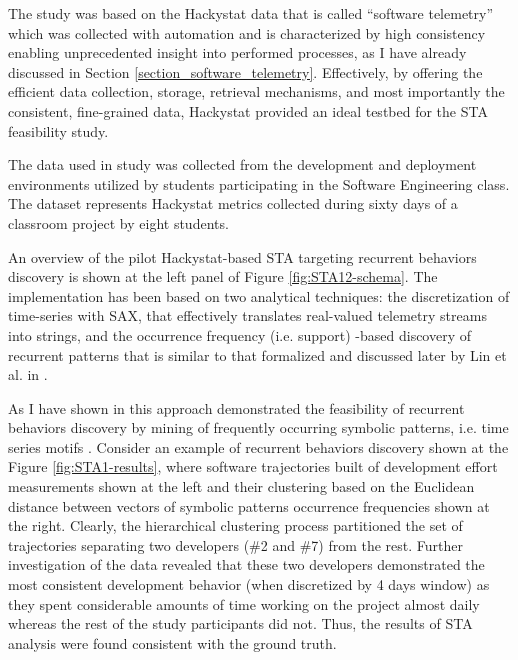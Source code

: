 The study was based on the Hackystat data that is called ``software telemetry'' \cite{citeulike:12929227} which was collected with automation and is characterized by high consistency enabling unprecedented insight into performed processes, as I have already discussed in Section \ref{section_software_telemetry}. Effectively, by offering the efficient data collection, storage, retrieval mechanisms, and most importantly the consistent, fine-grained data, Hackystat provided an ideal testbed for the STA feasibility study.

The data used in study was collected from the development and deployment environments utilized by students participating in the Software Engineering class. The dataset represents Hackystat metrics collected during sixty days of a classroom project by eight students. 

An overview of the pilot Hackystat-based STA targeting recurrent behaviors discovery is shown at the left panel of Figure  \ref{fig:STA12-schema}. The implementation has been based on two analytical techniques: the discretization of time-series with SAX, that effectively translates real-valued telemetry streams into strings, and the occurrence frequency (i.e. support) -based discovery of recurrent patterns that is similar to that formalized and discussed later by Lin et al. in \cite{citeulike:10525778}. 

As I have shown in \cite{csdl2-10-09} this approach demonstrated the feasibility of recurrent behaviors discovery by mining of frequently occurring symbolic patterns, i.e. time series motifs \cite{sax}. Consider an example of recurrent behaviors discovery shown at the Figure \ref{fig:STA1-results}, where software trajectories built of development effort measurements shown at the left and their clustering based on the Euclidean distance between vectors of symbolic patterns occurrence frequencies shown at the right. Clearly, the hierarchical clustering process partitioned the set of trajectories separating two developers (\#2 and \#7) from the rest. Further investigation of the data revealed that these two developers demonstrated the most consistent development behavior (when discretized by 4 days window) as they spent considerable amounts of time working on the project almost daily whereas the rest of the study participants did not. Thus, the results of STA analysis were found consistent with the ground truth.

